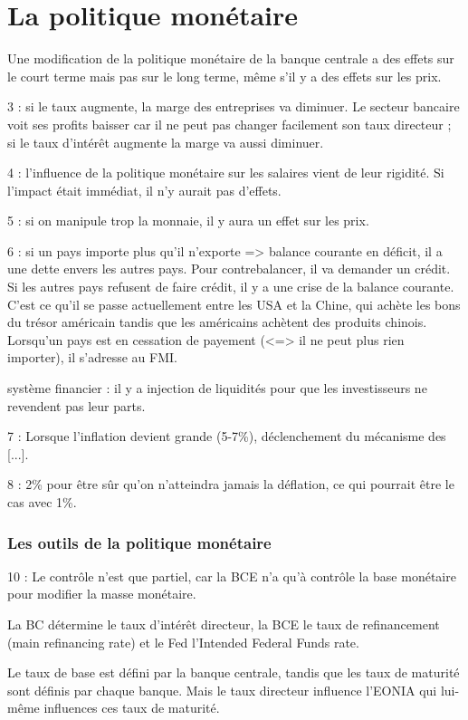 \part{La politique monétaire}

Une modification de la politique monétaire de la banque centrale a des effets sur le court terme mais pas sur le long terme, même s'il y a des effets sur les prix.

3 : si le taux augmente, la marge des entreprises va diminuer. Le secteur bancaire voit ses profits baisser car il ne peut pas changer facilement son taux directeur ; si le taux d'intérêt augmente la marge va aussi diminuer.

4 : l'influence de la politique monétaire sur les salaires vient de leur rigidité. Si l'impact était immédiat, il n'y aurait pas d'effets.

5 : si on manipule trop la monnaie, il y aura un effet sur les prix.

6 : si un pays importe plus qu'il n'exporte => balance courante en déficit, il a une dette envers les autres pays. Pour contrebalancer, il va demander un crédit. Si les autres pays refusent de faire crédit, il y a une crise de la balance courante. C'est ce qu'il se passe actuellement entre les USA et la Chine, qui achète les bons du trésor américain tandis que les américains achètent des produits chinois. Lorsqu'un pays est en cessation de payement (<=> il ne peut plus rien importer), il s'adresse au FMI.

système financier : il y a injection de liquidités pour que les investisseurs ne revendent pas leur parts.

7 : Lorsque l'inflation devient grande (5-7\%), déclenchement du mécanisme des [...].

8 : 2\% pour être sûr qu'on n'atteindra jamais la déflation, ce qui pourrait être le cas avec 1\%.

\section{Les outils de la politique monétaire}

10 : Le contrôle n'est que partiel, car la BCE n'a qu'à contrôle la base monétaire pour modifier la masse monétaire.

La BC détermine le taux d'intérêt directeur, la BCE le taux de refinancement (main refinancing rate) et le Fed l'Intended Federal Funds rate.

Le taux de base est défini par la banque centrale, tandis que les taux de maturité sont définis par chaque banque. Mais le taux directeur influence l'EONIA qui lui-même influences ces taux de maturité.

